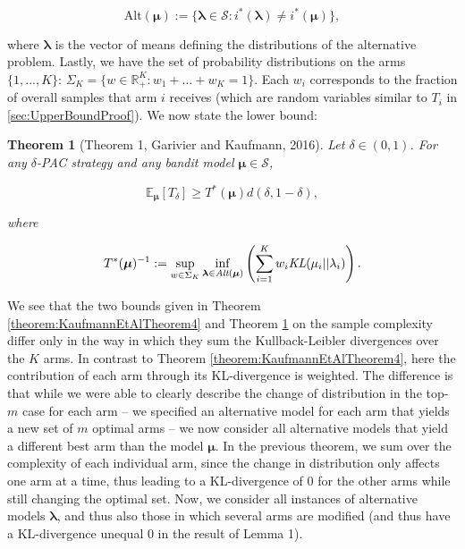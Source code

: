 \documentclass[11pt,]{article}
\newtheorem{theorem}{Theorem}
\begin{document}
\begin{equation*}
\text{Alt}(\bm{\mu}) := \{\bm{\lambda} \in \mathcal{S}: i^*(\bm{\lambda}) \neq i^*(\bm{\mu})\},
\end{equation*}

where \(\bm{\lambda}\) is the vector of means defining the distributions
of the alternative problem. Lastly, we have the set of probability
distributions on the arms \(\{1,...,K\}\):
\(\Sigma_K = \{w \in \mathbb{R}_{+}^K: w_1 + \dots + w_K = 1\}\). Each
\(w_i\) corresponds to the fraction of overall samples that arm \(i\)
receives (which are random variables similar to \(T_i\) in
\autoref{sec:UpperBoundProof}). We now state the lower bound:

\begin{theorem}[Theorem 1, Garivier and Kaufmann, 2016] \label{theorem:GarivierKaufmannTheorem1}
Let $\delta \in (0,1)$. For any $\delta$-PAC strategy and any bandit model $\bm{\mu} \in \mathcal{S}$,

\begin{equation*}
\mathbb{E}_{\bm{\mu}} [T_{\delta}] \geq T^*(\bm{\mu}) d(\delta,1-\delta),
\end{equation*}

where 

\begin{equation} \label{eq:GarivierKaufmann_Theorem1_Game}
T^*(\bm{\mu})^{-1} := \sup_{w \in \Sigma_K} \inf_{\bm{\lambda} \in \text{\em{Alt}}(\bm{\mu})} \left( \sum_{i=1}^K w_i \text{\em{KL}}(\mu_i|| \lambda_i)\right).
\end{equation}
\end{theorem}

We see that the two bounds given in Theorem
\ref{theorem:KaufmannEtAlTheorem4} and Theorem
\ref{theorem:GarivierKaufmannTheorem1} on the sample complexity differ
only in the way in which they sum the Kullback-Leibler divergences over
the \(K\) arms. In contrast to Theorem
\ref{theorem:KaufmannEtAlTheorem4}, here the contribution of each arm
through its KL-divergence is weighted. The difference is that while we
were able to clearly describe the change of distribution in the
top-\(m\) case for each arm -- we specified an alternative model for
each arm that yields a new set of \(m\) optimal arms -- we now consider
all alternative models that yield a different best arm than the model
\(\bm{\mu}\). In the previous theorem, we sum over the complexity of
each individual arm, since the change in distribution only affects one
arm at a time, thus leading to a KL-divergence of 0 for the other arms
while still changing the optimal set. Now, we consider all instances of
alternative models \(\bm{\lambda}\), and thus also those in which
several arms are modified (and thus have a KL-divergence unequal 0 in
the result of Lemma 1).
\end{document}
